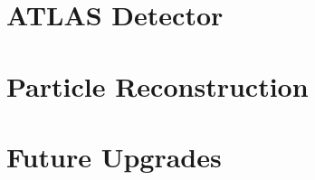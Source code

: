 \label{sec:LHC}

\section{ATLAS Detector}
\label{sec:ATLAS}


\section{ Particle Reconstruction} 
\label{sec:ParticleReconstruction}


\section{Future Upgrades}
\label{sec:FutureUpgrades}

